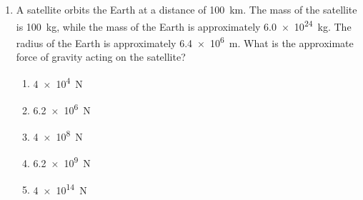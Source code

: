 \documentclass{../../oss-apphys}
\begin{document}
\begin{multicols}{2}
\begin{enumerate}[leftmargin=18pt,start=8]
  \item A satellite orbits the Earth at a distance of \SI{100}{km}. The mass of
    the satellite is \SI{100}{kg}, while the mass of the Earth is approximately
    \SI{6.0e24}{kg}. The radius of the Earth is approximately \SI{6.4e6}{m}.
    What is the approximate force of gravity acting on the satellite?
    \begin{enumerate}[noitemsep,topsep=0pt,leftmargin=18pt]
    \item\SI{4e4}{N}
    \item\SI{6.2e6}{N}
    \item\SI{4e8}{N}
    \item\SI{6.2e9}{N}
    \item\SI{4e14}{N}
    \end{enumerate}

    \columnbreak
    

\end{enumerate}
\end{multicols}
\end{document}
